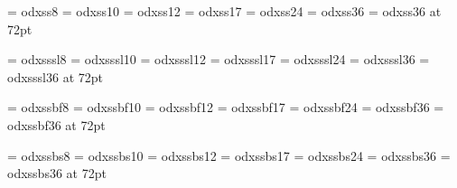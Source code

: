 
\font\odxss@VIII     = odxss8
\font\odxss@X	     = odxss10
\font\odxss@XII      = odxss12
\font\odxss@XVII     = odxss17
\font\odxss@XXIV     = odxss24
\font\odxss@XXXVI    = odxss36
\font\odxss@LXXII    = odxss36 at 72pt

\font\odxsssl@VIII   = odxsssl8
\font\odxsssl@X      = odxsssl10
\font\odxsssl@XII    = odxsssl12
\font\odxsssl@XVII   = odxsssl17
\font\odxsssl@XXIV   = odxsssl24
\font\odxsssl@XXXVI  = odxsssl36
\font\odxsssl@LXXII  = odxsssl36 at 72pt

\font\odxssbf@VIII   = odxssbf8
\font\odxssbf@X      = odxssbf10
\font\odxssbf@XII    = odxssbf12
\font\odxssbf@XVII   = odxssbf17
\font\odxssbf@XXIV   = odxssbf24
\font\odxssbf@XXXVI  = odxssbf36
\font\odxssbf@LXXII  = odxssbf36 at 72pt

\font\odxssbs@VIII   = odxssbs8
\font\odxssbs@X      = odxssbs10
\font\odxssbs@XII    = odxssbs12
\font\odxssbs@XVII   = odxssbs17
\font\odxssbs@XXIV   = odxssbs24
\font\odxssbs@XXXVI  = odxssbs36
\font\odxssbs@LXXII  = odxssbs36 at 72pt

\def\odxssVIII{\odxss@VIII\baselineskip=9pt}
\def\odxss{\odxss@X\baselineskip=12pt}
\def\odxssXII{\odxss@XII\baselineskip=15pt}
\def\odxssXVII{\odxss@XVII\baselineskip=20pt}
\def\odxssXXIV{\odxss@XXIV\baselineskip=26pt}
\def\odxssXXXVI{\odxss@XXXVI\baselineskip=36pt}
\def\odxssLXXII{\odxss@LXXII\baselineskip=72pt}

\def\odxssslVIII{\odxsssl@VIII\baselineskip=9pt}
\def\odxsssl{\odxsssl@X\baselineskip=12pt}
\def\odxssslXII{\odxsssl@XII\baselineskip=15pt}
\def\odxssslXVII{\odxsssl@XVII\baselineskip=20pt}
\def\odxssslXXIV{\odxsssl@XXIV\baselineskip=26pt}
\def\odxssslXXXVI{\odxsssl@XXXVI\baselineskip=36pt}
\def\odxssslLXXII{\odxsssl@LXXII\baselineskip=72pt}

\def\odxssbfVIII{\odxssbf@VIII\baselineskip=9pt}
\def\odxssbf{\odxssbf@X\baselineskip=12pt}
\def\odxssbfXII{\odxssbf@XII\baselineskip=15pt}
\def\odxssbfXVII{\odxssbf@XVII\baselineskip=20pt}
\def\odxssbfXXIV{\odxssbf@XXIV\baselineskip=26pt}
\def\odxssbfXXXVI{\odxssbf@XXXVI\baselineskip=36pt}
\def\odxssbfLXXII{\odxssbf@LXXII\baselineskip=72pt}

\def\odxssbsVIII{\odxssbs@VIII\baselineskip=9pt}
\def\odxssbs{\odxssbs@X\baselineskip=12pt}
\def\odxssbsXII{\odxssbs@XII\baselineskip=15pt}
\def\odxssbsXVII{\odxssbs@XVII\baselineskip=20pt}
\def\odxssbsXXIV{\odxssbs@XXIV\baselineskip=26pt}
\def\odxssbsXXXVI{\odxssbs@XXXVI\baselineskip=36pt}
\def\odxssbsLXXII{\odxssbs@LXXII\baselineskip=72pt}

